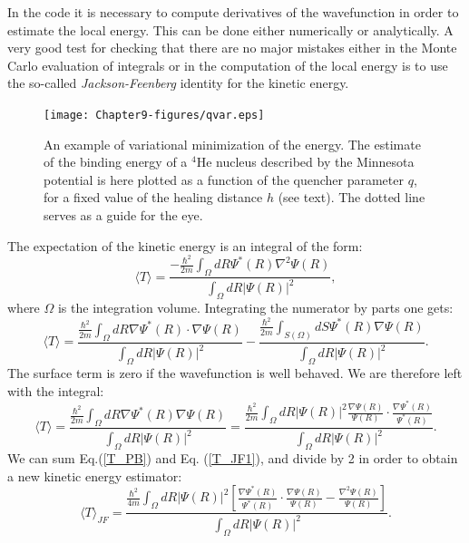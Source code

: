 In the code it is necessary to compute derivatives of the wavefunction in order to estimate the local energy. This can be done either numerically or analytically. A very good test for checking that there are no major mistakes either in the Monte Carlo evaluation of integrals or in the computation of the local energy is to use the so-called {\it Jackson-Feenberg} identity for the kinetic energy.
\begin{figure}
	\begin{center}
		\texttt{[image: Chapter9-figures/qvar.eps]}
	\end{center}
	\caption{An example of variational minimization of the energy. The estimate of the binding energy of a $^4$He nucleus described by the Minnesota potential is here plotted as a function of the quencher parameter $q$, for a fixed value of the healing distance $h$ (see text). The dotted line serves as a guide for the eye.}
	\label{fig.var}
\end{figure}
The expectation of the kinetic energy is an integral of the form:
\begin{equation}
\label{T_PB}
\langle T\rangle = \frac{\displaystyle-\frac{\hbar^2}{2m}\int_\Omega dR \Psi^*(R)\nabla^2\Psi(R)}{\displaystyle\int_\Omega dR |\Psi(R)|^2},
\end{equation}
where $\Omega$ is the integration volume. Integrating the numerator by parts one gets:
\begin{equation}
\langle T\rangle = \frac{\displaystyle\frac{\hbar^2}{2m}\int_\Omega dR \nabla\Psi^*(R)\cdot\nabla\Psi(R)}{\displaystyle\int_\Omega dR |\Psi(R)|^2} -\frac{\displaystyle\frac{\hbar^2}{2m}\int_{S(\Omega)} dS\Psi^*(R)\nabla\Psi(R) }{\displaystyle\int_\Omega dR |\Psi(R)|^2}.
\end{equation}
The surface term is zero if the wavefunction is well behaved. We are therefore left with the integral:
\begin{equation}
\label{T_JF1}
\langle T\rangle = \frac{\displaystyle\frac{\hbar^2}{2m}\int_\Omega dR \nabla\Psi^*(R)\nabla\Psi(R)}{\displaystyle\int_\Omega dR |\Psi(R)|^2}= \frac{
	\displaystyle\frac{\hbar^2}{2m}\int_\Omega dR|\Psi(R)|^2 \frac{\nabla\Psi(R)}{\Psi(R)}\cdot
\frac{\nabla\Psi^*(R)}{\Psi^*(R)}
}{\displaystyle\int_\Omega dR |\Psi(R)|^2}.
\end{equation}
We can sum Eq.(\ref{T_PB}) and Eq. (\ref{T_JF1}), and divide by 2 in order to obtain a new kinetic energy estimator:
\begin{equation}
\langle T\rangle_{JF} = \frac{
	\displaystyle\frac{\hbar^2}{4m}\int_\Omega dR|\Psi(R)|^2 \left[\frac{\nabla\Psi^*(R)}{\Psi^*(R)}\cdot
	\frac{\nabla\Psi(R)}{\Psi(R)}-\frac{\nabla^2\Psi(R)}{\Psi(R)}\right]
}{\displaystyle\int_\Omega dR |\Psi(R)|^2}.
\end{equation}
